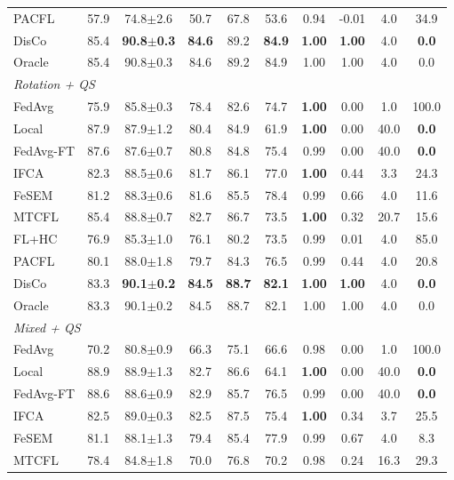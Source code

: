 \begin{tabular}{lccccccccc}
PACFL & 57.9 & 74.8$\pm$2.6 & 50.7 & 67.8 & 53.6 & 0.94 & -0.01 & 4.0 & 34.9 \\
DisCo & 85.4 & \textbf{90.8$\pm$0.3} & \textbf{84.6} & 89.2 & \textbf{84.9} & \textbf{1.00} & \textbf{1.00} & 4.0 & \textbf{0.0} \\
Oracle & 85.4 & 90.8$\pm$0.3 & 84.6 & 89.2 & 84.9 & 1.00 & 1.00 & 4.0 & 0.0 \\
\midrule
\multicolumn{10}{l}{\textit{Rotation + QS}}\\
FedAvg & 75.9 & 85.8$\pm$0.3 & 78.4 & 82.6 & 74.7 & \textbf{1.00} & 0.00 & 1.0 & 100.0 \\
Local & 87.9 & 87.9$\pm$1.2 & 80.4 & 84.9 & 61.9 & \textbf{1.00} & 0.00 & 40.0 & \textbf{0.0} \\
FedAvg-FT & 87.6 & 87.6$\pm$0.7 & 80.8 & 84.8 & 75.4 & 0.99 & 0.00 & 40.0 & \textbf{0.0} \\
IFCA & 82.3 & 88.5$\pm$0.6 & 81.7 & 86.1 & 77.0 & \textbf{1.00} & 0.44 & 3.3 & 24.3 \\
FeSEM & 81.2 & 88.3$\pm$0.6 & 81.6 & 85.5 & 78.4 & 0.99 & 0.66 & 4.0 & 11.6 \\
MTCFL & 85.4 & 88.8$\pm$0.7 & 82.7 & 86.7 & 73.5 & \textbf{1.00} & 0.32 & 20.7 & 15.6 \\
FL+HC & 76.9 & 85.3$\pm$1.0 & 76.1 & 80.2 & 73.5 & 0.99 & 0.01 & 4.0 & 85.0 \\
PACFL & 80.1 & 88.0$\pm$1.8 & 79.7 & 84.3 & 76.5 & 0.99 & 0.44 & 4.0 & 20.8 \\
DisCo & 83.3 & \textbf{90.1$\pm$0.2} & \textbf{84.5} & \textbf{88.7} & \textbf{82.1} & \textbf{1.00} & \textbf{1.00} & 4.0 & \textbf{0.0} \\
Oracle & 83.3 & 90.1$\pm$0.2 & 84.5 & 88.7 & 82.1 & 1.00 & 1.00 & 4.0 & 0.0 \\
\midrule
\multicolumn{10}{l}{\textit{Mixed + QS}}\\
FedAvg & 70.2 & 80.8$\pm$0.9 & 66.3 & 75.1 & 66.6 & 0.98 & 0.00 & 1.0 & 100.0 \\
Local & 88.9 & 88.9$\pm$1.3 & 82.7 & 86.6 & 64.1 & \textbf{1.00} & 0.00 & 40.0 & \textbf{0.0} \\
FedAvg-FT & 88.6 & 88.6$\pm$0.9 & 82.9 & 85.7 & 76.5 & 0.99 & 0.00 & 40.0 & \textbf{0.0} \\
IFCA & 82.5 & 89.0$\pm$0.3 & 82.5 & 87.5 & 75.4 & \textbf{1.00} & 0.34 & 3.7 & 25.5 \\
FeSEM & 81.1 & 88.1$\pm$1.3 & 79.4 & 85.4 & 77.9 & 0.99 & 0.67 & 4.0 & 8.3 \\
MTCFL & 78.4 & 84.8$\pm$1.8 & 70.0 & 76.8 & 70.2 & 0.98 & 0.24 & 16.3 & 29.3 \\

\end{tabular}
